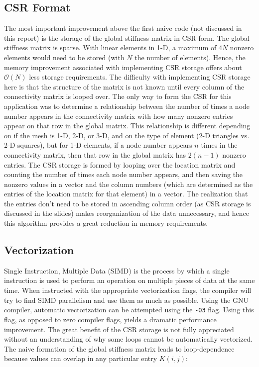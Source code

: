 \documentclass[10pt]{article}
\begin{document}
\subsection{CSR Format}
The most important improvement above the first naive code (not discussed in this report) is the storage of the global stiffness matrix in CSR form. The global stiffness matrix is sparse. With linear elements in 1-D, a maximum of \(4N\) nonzero elements would need to be stored (with \(N\) the number of elements). Hence, the memory improvement associated with implementing CSR storage offers about \(\mathscr{O}(N)\) less storage requirements. The difficulty with implementing CSR storage here is that the structure of the matrix is not known until every column of the connectivity matrix is looped over. The only way to form the CSR for this application was to determine a relationship between the number of times a node number appears in the connectivity matrix with how many nonzero entries appear on that row in the global matrix. This relationship is different depending on if the mesh is 1-D, 2-D, or 3-D, and on the type of element (2-D triangles vs. 2-D squares), but for 1-D elements, if a node number appears \(n\) times in the connectivity matrix, then that row in the global matrix has \(2(n-1)\) nonzero entries. The CSR storage is formed by looping over the location matrix and counting the number of times each node number appears, and then saving the nonzero values in a vector and the column numbers (which are determined as the entries of the location matrix for that element) in a vector. The realization that the entries don't need to be stored in ascending column order (as CSR storage is discussed in the slides) makes reorganization of the data unnecessary, and hence this algorithm provides a great reduction in memory requirements. 

\subsection{Vectorization}

Single Instruction, Multiple Data (SIMD) is the process by which a single instruction is used to perform an operation on multiple pieces of data at the same time. When instructed with the appropriate vectorization flags, the compiler will try to find SIMD parallelism and use them as much as possible. Using the GNU compiler, automatic vectorization can be attempted using the {\tt -O3} flag. Using this flag, as opposed to zero compiler flags, yields a dramatic performance improvement. The great benefit of the CSR storage is not fully appreciated without an understanding of why some loops cannot be automatically vectorized. The naive formation of the global stiffness matrix leads to loop-dependence because values can overlap in any particular entry \(K(i, j)\):
\end{document}

